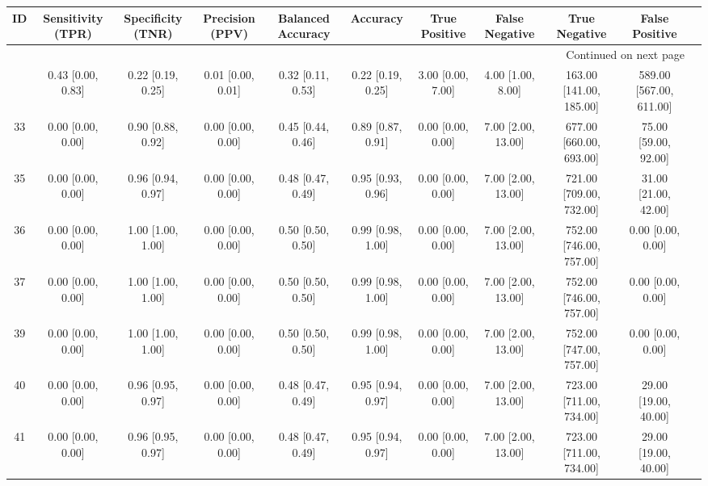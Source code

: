 \documentclass[8pt]{article}
\begin{document}
\begin{center}
\begin{footnotesize}
\begin{longtable}{|ccccccccccc|}
\toprule
 ID &  Sensitivity (TPR) &  Specificity (TNR) &    Precision (PPV) &  Balanced Accuracy &           Accuracy &      True Positive &      False Negative &            True Negative &           False Positive \\
\midrule
\endhead
\midrule
\multicolumn{10}{r}{{Continued on next page}} \\
\midrule
\endfoot

\bottomrule
\endlastfoot
 38 &  0.43 [0.00, 0.83] &  0.22 [0.19, 0.25] &  0.01 [0.00, 0.01] &  0.32 [0.11, 0.53] &  0.22 [0.19, 0.25] &  3.00 [0.00, 7.00] &   4.00 [1.00, 8.00] &  163.00 [141.00, 185.00] &  589.00 [567.00, 611.00] \\
 33 &  0.00 [0.00, 0.00] &  0.90 [0.88, 0.92] &  0.00 [0.00, 0.00] &  0.45 [0.44, 0.46] &  0.89 [0.87, 0.91] &  0.00 [0.00, 0.00] &  7.00 [2.00, 13.00] &  677.00 [660.00, 693.00] &     75.00 [59.00, 92.00] \\
 35 &  0.00 [0.00, 0.00] &  0.96 [0.94, 0.97] &  0.00 [0.00, 0.00] &  0.48 [0.47, 0.49] &  0.95 [0.93, 0.96] &  0.00 [0.00, 0.00] &  7.00 [2.00, 13.00] &  721.00 [709.00, 732.00] &     31.00 [21.00, 42.00] \\
 36 &  0.00 [0.00, 0.00] &  1.00 [1.00, 1.00] &  0.00 [0.00, 0.00] &  0.50 [0.50, 0.50] &  0.99 [0.98, 1.00] &  0.00 [0.00, 0.00] &  7.00 [2.00, 13.00] &  752.00 [746.00, 757.00] &        0.00 [0.00, 0.00] \\
 37 &  0.00 [0.00, 0.00] &  1.00 [1.00, 1.00] &  0.00 [0.00, 0.00] &  0.50 [0.50, 0.50] &  0.99 [0.98, 1.00] &  0.00 [0.00, 0.00] &  7.00 [2.00, 13.00] &  752.00 [746.00, 757.00] &        0.00 [0.00, 0.00] \\
 39 &  0.00 [0.00, 0.00] &  1.00 [1.00, 1.00] &  0.00 [0.00, 0.00] &  0.50 [0.50, 0.50] &  0.99 [0.98, 1.00] &  0.00 [0.00, 0.00] &  7.00 [2.00, 13.00] &  752.00 [747.00, 757.00] &        0.00 [0.00, 0.00] \\
 40 &  0.00 [0.00, 0.00] &  0.96 [0.95, 0.97] &  0.00 [0.00, 0.00] &  0.48 [0.47, 0.49] &  0.95 [0.94, 0.97] &  0.00 [0.00, 0.00] &  7.00 [2.00, 13.00] &  723.00 [711.00, 734.00] &     29.00 [19.00, 40.00] \\
 41 &  0.00 [0.00, 0.00] &  0.96 [0.95, 0.97] &  0.00 [0.00, 0.00] &  0.48 [0.47, 0.49] &  0.95 [0.94, 0.97] &  0.00 [0.00, 0.00] &  7.00 [2.00, 13.00] &  723.00 [711.00, 734.00] &     29.00 [19.00, 40.00] \\

\end{longtable}
\end{footnotesize}
\end{center}
\end{document}
